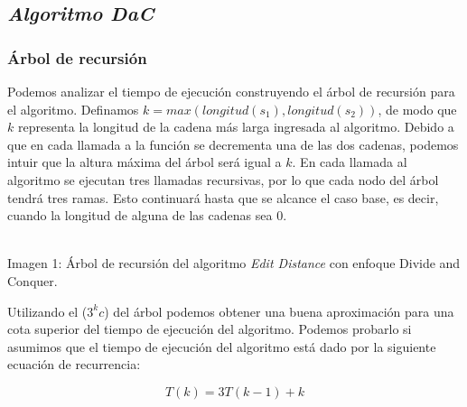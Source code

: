\subsection{\textit{\textbf{Algoritmo DaC}}}


\subsubsection{Árbol de recursión}
Podemos analizar el tiempo de ejecución construyendo el árbol de recursión para el algoritmo. Definamos $k=max(longitud(s_1), longitud(s_2))$, de modo que $k$ representa la longitud de la cadena más larga ingresada al algoritmo. Debido a que en cada llamada a la función se decrementa una de las dos cadenas, podemos intuir que la altura máxima del árbol será igual a $k$. En cada llamada al algoritmo se ejecutan tres llamadas recursivas, por lo que cada nodo del árbol tendrá tres ramas. Esto continuará hasta que se alcance el caso base, es decir, cuando la longitud de alguna de las cadenas sea $0$.

\begin{center}
\\
\vspace{0.02in}
\small\textcolor{FSBlue}{Imagen 1: Árbol de recursión del algoritmo \textit{Edit Distance}} con enfoque Divide and Conquer.
\end{center}

Utilizando el  ($3^kc$) del árbol podemos obtener una buena aproximación para una cota superior del tiempo de ejecución del algoritmo. Podemos probarlo si asumimos que el tiempo de ejecución del algoritmo está dado por la siguiente ecuación de recurrencia:

\[T(k)=3T(k-1)+k\]

